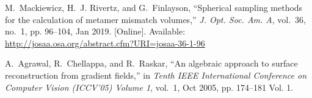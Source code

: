 \documentclass[conference]{IEEEtran}
\begin{document}
\begin{thebibliography}{1}
\BIBentryALTinterwordspacing
M.~Mackiewicz, H.~J. Rivertz, and G.~Finlayson, ``Spherical sampling methods
  for the calculation of metamer mismatch volumes,'' \emph{J. Opt. Soc. Am. A},
  vol.~36, no.~1, pp. 96--104, Jan 2019. [Online]. Available:
  \url{http://josaa.osa.org/abstract.cfm?URI=josaa-36-1-96}
\BIBentrySTDinterwordspacing

A.~{Agrawal}, R.~{Chellappa}, and R.~{Raskar}, ``An algebraic approach to
  surface reconstruction from gradient fields,'' in \emph{Tenth IEEE
  International Conference on Computer Vision (ICCV'05) Volume 1}, vol.~1, Oct 2005, pp. 174--181 Vol. 1.\\[-2mm]

\end{thebibliography}
\end{document}
